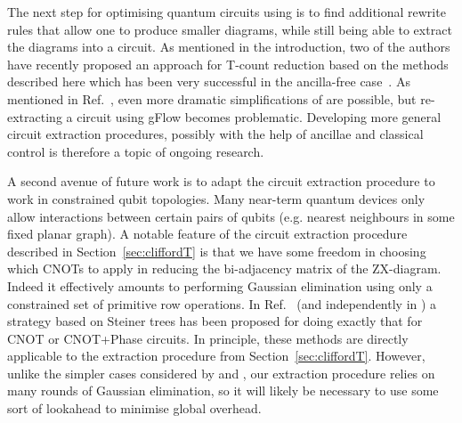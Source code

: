 \documentclass[a4paper,onecolumn,superscriptaddress,11pt,accepted=2020-04-27]{quantumarticle}
\newcommand{\CX}{\ensuremath{\textrm{CNOT}}\xspace}
\newcommand{\CNOT}{\CX}
\theoremstyle{definition}
\begin{document}
The next step for optimising quantum circuits using \zxdiagrams is to find additional rewrite rules that allow one to produce smaller diagrams, while still being able to extract the diagrams into a circuit. As mentioned in the introduction, two of the authors have recently proposed an approach for T-count reduction based on the methods described here which has been very successful in the ancilla-free case~\cite{zxtcount}. As mentioned in Ref.~\cite{zxtcount}, even more dramatic simplifications of \zxdiagrams are possible, but re-extracting a circuit using gFlow becomes problematic. Developing more general circuit extraction procedures, possibly with the help of ancillae and classical control is therefore a topic of ongoing research.


A second avenue of future work is to adapt the circuit extraction procedure to work in constrained qubit topologies. Many near-term quantum devices only allow interactions between certain pairs of qubits (e.g. nearest neighbours in some fixed planar graph). A notable feature of the circuit extraction procedure described in Section~\ref{sec:cliffordT} is that we have some freedom in choosing which CNOTs to apply in reducing the bi-adjacency matrix of the ZX-diagram. Indeed it effectively amounts to performing Gaussian elimination using only a constrained set of primitive row operations. In Ref.~\cite{kissinger2019cnot} (and independently in \cite{nash2019quantum}) a strategy based on Steiner trees has been proposed for doing exactly that for CNOT or CNOT+Phase circuits. In principle, these methods are directly applicable to the extraction procedure from Section~\ref{sec:cliffordT}. However, unlike the simpler cases considered by \cite{kissinger2019cnot} and \cite{nash2019quantum}, our extraction procedure relies on many rounds of Gaussian elimination, so it will likely be necessary to use some sort of lookahead to minimise global overhead.
\end{document}
